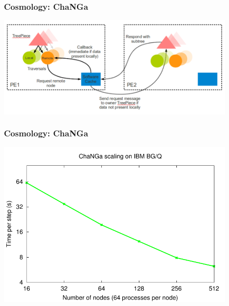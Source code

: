 \begin{frame}
\frametitle{Cosmology: ChaNGa}
\begin{center}
\includegraphics[width=0.9\textwidth]{../figures/changa.pdf}
\end{center}
\end{frame}


\begin{frame}
\frametitle{Cosmology: ChaNGa}
\begin{center}
\includegraphics[width=0.9\textwidth]{../figures/changa-scaling.pdf}
\end{center}
\end{frame}


